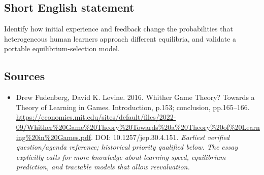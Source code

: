 \documentclass[11pt]{article}
\begin{document}
\subsection{Short English statement}
Identify how initial experience and feedback change the probabilities that heterogeneous human learners approach different equilibria, and validate a portable equilibrium-selection model.

\subsection{Sources}
\begin{itemize}\raggedright
\item[\textnormal{[S1]}]\hypertarget{source:30007563:1}{} Drew Fudenberg, David K. Levine. 2016. Whither Game Theory? Towards a Theory of Learning in Games. Introduction, p.153; conclusion, pp.165–166.
\url{https://economics.mit.edu/sites/default/files/2022-09/Whither%20Game%20Theory%20Towards%20a%20Theory%20of%20Learning%20in%20Games.pdf}.
DOI: 10.1257/jep.30.4.151.
{\small\textit{Earliest verified question/agenda reference; historical priority qualified below. The essay explicitly calls for more knowledge about learning speed, equilibrium prediction, and tractable models that allow reevaluation.}}
\end{itemize}
\end{document}
